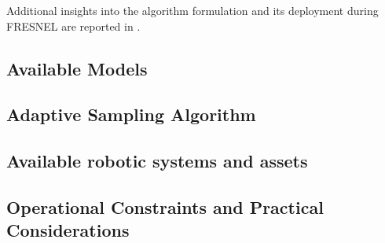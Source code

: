 Additional insights into the algorithm formulation and its deployment during FRESNEL are reported in \cite{bernacchi2025}.

\subsection{Available Models}
\subsection{Adaptive Sampling Algorithm}
\subsection{Available robotic systems and assets}


\subsection{Operational Constraints and Practical Considerations}


    


